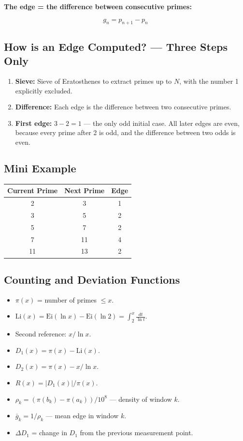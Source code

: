 \documentclass[12pt,a4paper]{article}
\begin{document}
\textbf{The edge = the difference between consecutive primes:}

\[
g_n = p_{n+1} - p_n
\]

\subsection{How is an Edge Computed? — Three Steps Only}

\begin{enumerate}
\item \textbf{Sieve:} Sieve of Eratosthenes to extract primes up to $N$, with the number 1 explicitly excluded.
\item \textbf{Difference:} Each edge is the difference between two consecutive primes.
\item \textbf{First edge:} $3 - 2 = 1$ — the only odd initial case. All later edges are even, because every prime after 2 is odd, and the difference between two odds is even.
\end{enumerate}

\subsection{Mini Example}

\begin{table}[h]
\centering
\begin{tabular}{ccc}
\toprule
Current Prime & Next Prime & Edge \\
\midrule
2 & 3 & 1 \\
3 & 5 & 2 \\
5 & 7 & 2 \\
7 & 11 & 4 \\
11 & 13 & 2 \\
\bottomrule
\end{tabular}
\end{table}

\subsection{Counting and Deviation Functions}

\begin{itemize}
\item $\pi(x)$ = number of primes $\leq x$.
\item $\mathrm{Li}(x) = \mathrm{Ei}(\ln x) - \mathrm{Ei}(\ln 2) = \int_2^x \frac{dt}{\ln t}$.
\item Second reference: $x / \ln x$.
\item $D_1(x) = \pi(x) - \mathrm{Li}(x)$.
\item $D_2(x) = \pi(x) - x/\ln x$.
\item $R(x) = |D_1(x)| / \pi(x)$.
\item $\rho_k = (\pi(b_k) - \pi(a_k)) / 10^8$ — density of window $k$.
\item $\bar{g}_k = 1 / \rho_k$ — mean edge in window $k$.
\item $\Delta D_1$ = change in $D_1$ from the previous measurement point.
\end{itemize}
\end{document}
